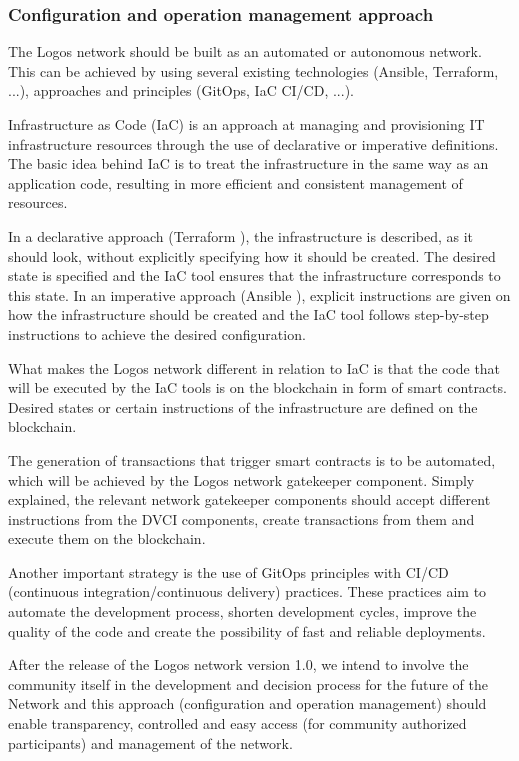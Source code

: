 \documentclass[]{article}
\begin{document}
\subsubsection{Configuration and operation management approach}
The Logos network should be built as an automated or autonomous network. 
This can be achieved by using several existing technologies (Ansible, Terraform, ...), approaches and principles (GitOps, IaC CI/CD, ...). 

Infrastructure as Code (IaC) \cite{Wikipedia-iac} is an approach at managing and provisioning IT infrastructure resources through the use of declarative or imperative definitions.
The basic idea behind IaC is to treat the infrastructure in the same way as an application code, resulting in more efficient and consistent management of resources.

In a declarative approach (Terraform \cite{HashiDoc}), the infrastructure is described, as it should look, without explicitly specifying how it should be created. 
The desired state is specified and the IaC tool ensures that the infrastructure corresponds to this state.
In an imperative approach (Ansible \cite{AnsiDoc}), explicit instructions are given on how the infrastructure should be created and the IaC tool follows step-by-step instructions to achieve the desired configuration.

What makes the Logos network different in relation to IaC is that the code that will be executed by the IaC tools is on the blockchain in form of smart contracts.
Desired states or certain instructions of the infrastructure are defined on the blockchain.

The generation of transactions that trigger smart contracts is to be automated, which will be achieved by the Logos network gatekeeper component. 
Simply explained, the relevant network gatekeeper components should accept different instructions from the DVCI components, create transactions from them and execute them on the blockchain.

Another important strategy is the use of GitOps \cite{GitLabDoc} principles with CI/CD (continuous integration/continuous delivery) \cite{GitLabDoc-ci-cd} practices.
These practices aim to automate the development process, shorten development cycles, improve the quality of the code and create the possibility of fast and reliable deployments.

After the release of the Logos network version 1.0, we intend to involve the community itself in the development and decision process for the future of the Network and this approach (configuration and operation management) should enable transparency, controlled and easy access (for community authorized participants) and management of the network.
\end{document}
